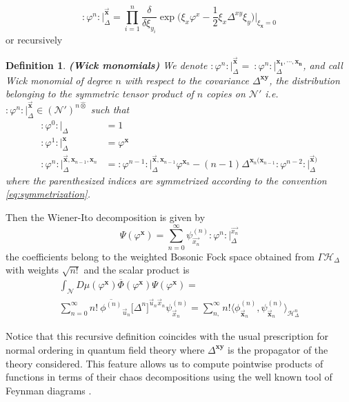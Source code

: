 \documentclass[12pt]{article}%
\newtheorem{definition}{Definition}%
\begin{document}
    \begin{equation}
    \label{eq:wickMonomialsGenerator}
    :\varphi^n:\lvert_\Delta^{\vec{\mathbf{x}}}=
    \prod_{i=1}^n\frac{\delta}{\delta \xi_{y_i}}
    \exp{\big(\xi_x\varphi^x-\frac12\xi_x\Delta^{xy}\xi_y\big)} \lvert_{\xi_{\mathbf{x}}=0}
    \end{equation}
    or recursively 
\begin{definition}
    \label{def:wickMonomials}{\bf (Wick monomials)} 
    We denote $:\varphi^n:\lvert_\Delta^{\vec{\mathbf{x}}}=\ :\varphi^n:\lvert_\Delta^{\mathbf{x_1,\cdots,x_n}}$, and call Wick monomial of degree $n$ with respect to the covariance $\Delta^{\mathbf{xy}}$, the distribution belonging to the symmetric tensor product of $n$ copies on $\mathcal{N}'$ i.e. $:\varphi^n:\lvert_\Delta^{\vec{\mathbf{x}}}\in(\mathcal{N}')^{n\hat{\otimes}}$ such that
    \begin{align}
        :\varphi^0:\lvert_\Delta&=1\nonumber\\
        :\varphi^1:\lvert_\Delta^{\mathbf{x}}&=\varphi^{\mathbf{x}}\nonumber\\
        :\varphi^n:\lvert_\Delta^{\vec{\mathbf{x}},{\mathbf{x}}_{n-1},{\mathbf{x}}_n}&=
        :\varphi^{n-1}:\lvert_\Delta^{\vec{{\mathbf{x}}},{\mathbf{x}}_{n-1}}\varphi^{{\mathbf{x}}_n}-(n-1)\Delta^{\mathbf{x}_n(\mathbf{x}_{n-1}}:\varphi^{n-2}:\lvert_\Delta^{\vec{\mathbf{x}})}
        \label{eqn:wickPowers}
    \end{align}
    where the parenthesized indices are symmetrized according to the convention  \eqref{eq:symmetrization}. 
\end{definition}
  Then the Wiener-Ito decomposition is given by
$$\Psi(\varphi^\mathbf{x})=\sum_{n=0}^\infty \psi^{(n)}_{\vec{x_n}}:\varphi^n:\lvert_\Delta^{\vec{{x}_n}}$$
 the coefficients belong to the weighted Bosonic Fock space obtained from $\Gamma\mathcal{H}_\Delta$ with weights $\sqrt{n!}$ and the scalar product is 
\begin{multline}
    \label{eq:complexchaosprod}
    \int_{\mathcal{N}}D\mu(\varphi^\mathbf{x})\overline{\Phi}(\varphi^\mathbf{x})\Psi(\varphi^\mathbf{x})
    = \\   \sum_{n=0}^\infty n!\ \overline{\phi^{(n)}}_{\vec{u}_n}\big[\Delta^n\big]^{\vec{u}_n\vec{x}_n}  \psi^{(n)}_{\vec{x}_n}
    = 
    \sum_{n,}^\infty n! \big\langle\phi^{(n)}_{\vec{\mathbf{x}}_n},\psi^{(n)}_{\vec{\mathbf{x}}_n}\big\rangle_{\mathcal{H}^{n}_\Delta}
    \end{multline}


    Notice that this recursive definition coincides with the usual prescription for normal ordering in quantum field theory where $\Delta^{\mathbf{xy}}$ is the propagator of the theory considered. This feature allows us to compute pointwise products of functions in terms of their chaos decompositions using the well known tool of Feynman diagrams \cite{Moshayedi2019}.
\end{document}
